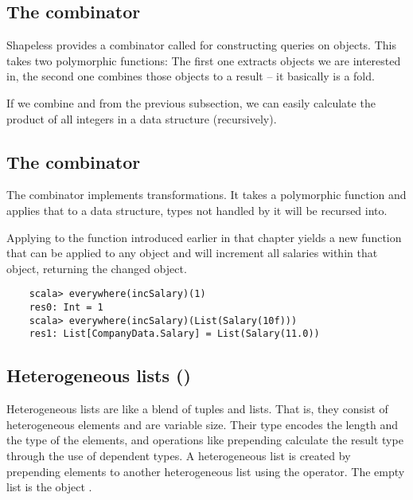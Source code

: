 \subsection{The  combinator}
Shapeless provides a combinator called  for constructing
queries on objects. This takes two polymorphic functions: The first one
extracts objects we are interested in, the second one combines those objects
to a result -- it basically is a fold.

\begin{example}
  If we combine  and  from the previous subsection, we can
  easily calculate the product of all integers in a data structure (recursively).
  
\end{example}

\subsection{The  combinator}
The  combinator implements transformations. It takes a
polymorphic function and applies that to a data structure, types
not handled by it will be recursed into.

\begin{example}
  Applying  to the function  introduced earlier
  in that chapter yields a new function that can be applied to any object
  and will increment all salaries within that object, returning the changed
  object.

  \begin{lstlisting}
    scala> everywhere(incSalary)(1)
    res0: Int = 1
    scala> everywhere(incSalary)(List(Salary(10f)))
    res1: List[CompanyData.Salary] = List(Salary(11.0))
  \end{lstlisting}
\end{example}

\subsection{Heterogeneous lists ()}
Heterogeneous lists are like a blend of tuples and lists. That is, they
consist of heterogeneous elements and are variable size. Their type encodes
the length and the type of the elements, and operations like prepending calculate
the result type through the use of dependent types.
A heterogeneous list is created by prepending elements to another heterogeneous
list using the \cd{::} operator. The empty list is the object .

